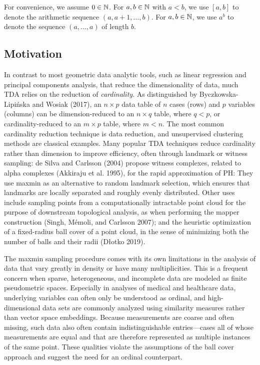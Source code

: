 \documentclass{article}
\begin{document}
For convenience, we assume \(0\in\mathbb{N}\). For \(a,b \in \mathbb{N}\) with \(a<b\),
we use \([a,b]\) to denote the arithmetic sequence \((a,a+1,\ldots,b)\).
For \(a,b \in \mathbb{N}\), we use \(a^b\) to denote the sequence
\((a,\ldots,a)\) of length \(b\).

\hypertarget{motivation}{%
\subsection{Motivation}\label{motivation}}

In contrast to most geometric data analytic tools, such as linear
regression and principal components analysis, that reduce the
dimensionality of data, much TDA relies on the reduction of
\emph{cardinality}. As distinguished by Byczkowska-Lipińska and Wosiak
(2017), an \(n\times p\) data table of \(n\) cases (rows) and \(p\)
variables (columns) can be dimension-reduced to an \(n\times q\) table,
where \(q<p\), or cardinality-reduced to an \(m\times p\) table, where
\(m<n\). The most common cardinality reduction technique is data
reduction, and unsupervised clustering methods are classical examples.
Many popular TDA techniques reduce cardinality rather than dimension to
improve efficiency, often through landmark or witness sampling: de Silva
and Carlsson (2004) propose witness complexes, related to alpha
complexes (Akkiraju et al. 1995), for the rapid approximation of PH:
They use maxmin as an alternative to random landmark selection, which
ensures that landmarks are locally separated and roughly evenly
distributed. Other uses include sampling points from a computationally
intractable point cloud for the purpose of downstream topological
analysis, as when performing the mapper construction (Singh, Mémoli, and
Carlsson 2007); and the heuristic optimization of a fixed-radius ball
cover of a point cloud, in the sense of minimizing both the number of
balls and their radii (Dłotko 2019).

The maxmin sampling procedure comes with its own limitations in the
analysis of data that vary greatly in density or have many
multiplicities. This is a frequent concern when sparse, heterogeneous,
and incomplete data are modeled as finite pseudometric spaces.
Especially in analyses of medical and healthcare data, underlying
variables can often only be understood as ordinal, and high-dimensional
data sets are commonly analyzed using similarity measures rather than
vector space embeddings. Because measurements are coarse and often
missing, such data also often contain indistinguishable entries---cases
all of whose measurements are equal and that are therefore represented
as multiple instances of the same point. These qualities violate the
assumptions of the ball cover approach and suggest the need for an
ordinal counterpart.
\end{document}

